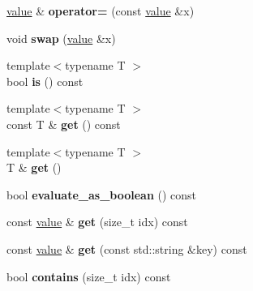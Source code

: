 \begin{DoxyCompactItemize}
\item 
\hypertarget{classpicojson_1_1value_acc5e4506e6a793af5132983573f9da6a}{\hyperlink{classpicojson_1_1value}{value} \& {\bfseries operator=} (const \hyperlink{classpicojson_1_1value}{value} \&x)}\label{classpicojson_1_1value_acc5e4506e6a793af5132983573f9da6a}

\item 
\hypertarget{classpicojson_1_1value_a6e3ac589ed811603ef9dadc6f91c737d}{void {\bfseries swap} (\hyperlink{classpicojson_1_1value}{value} \&x)}\label{classpicojson_1_1value_a6e3ac589ed811603ef9dadc6f91c737d}

\item 
\hypertarget{classpicojson_1_1value_ab67330d0c135a7c0fe689ef2294bda40}{{\footnotesize template$<$typename T $>$ }\\bool {\bfseries is} () const }\label{classpicojson_1_1value_ab67330d0c135a7c0fe689ef2294bda40}

\item 
\hypertarget{classpicojson_1_1value_a1b6f107770f2ae6fa9b4939313b0a917}{{\footnotesize template$<$typename T $>$ }\\const T \& {\bfseries get} () const }\label{classpicojson_1_1value_a1b6f107770f2ae6fa9b4939313b0a917}

\item 
\hypertarget{classpicojson_1_1value_a94f71153b3d14df524397a5cafcef2fc}{{\footnotesize template$<$typename T $>$ }\\T \& {\bfseries get} ()}\label{classpicojson_1_1value_a94f71153b3d14df524397a5cafcef2fc}

\item 
\hypertarget{classpicojson_1_1value_afa68a0efe890e7ab4a26cd7e3f842eb5}{bool {\bfseries evaluate\-\_\-as\-\_\-boolean} () const }\label{classpicojson_1_1value_afa68a0efe890e7ab4a26cd7e3f842eb5}

\item 
\hypertarget{classpicojson_1_1value_a93d61431aeb912ba605e20c2cd2a0d97}{const \hyperlink{classpicojson_1_1value}{value} \& {\bfseries get} (size\-\_\-t idx) const }\label{classpicojson_1_1value_a93d61431aeb912ba605e20c2cd2a0d97}

\item 
\hypertarget{classpicojson_1_1value_a703fb6a50c2e8eec30fdf6b03eec1493}{const \hyperlink{classpicojson_1_1value}{value} \& {\bfseries get} (const std\-::string \&key) const }\label{classpicojson_1_1value_a703fb6a50c2e8eec30fdf6b03eec1493}

\item 
\hypertarget{classpicojson_1_1value_a60efde50d8b780998ea663b0239c6c46}{bool {\bfseries contains} (size\-\_\-t idx) const }\label{classpicojson_1_1value_a60efde50d8b780998ea663b0239c6c46}


\end{DoxyCompactItemize}

